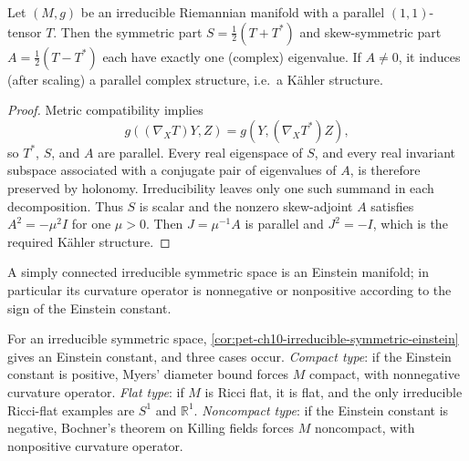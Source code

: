 \begin{theorem}
  \label{thm:pet-ch10-parallel-tensor-eigenvalue}

  Let $(M,g)$ be an irreducible Riemannian manifold with a parallel $(1,1)$-tensor
  $T$. Then the symmetric part $S=\tfrac12(T+T^*)$ and skew-symmetric part
  $A=\tfrac12(T-T^*)$ each have exactly one (complex) eigenvalue. If $A\ne0$, it
  induces (after scaling) a parallel complex structure, i.e.\ a Kähler structure.
\end{theorem}
\begin{proof}
  \sketch
  Metric compatibility implies
  \[
    g((\nabla_XT)Y,Z)=g(Y,(\nabla_XT^*)Z),
  \]
  so $T^*$, $S$, and $A$ are parallel. Every real eigenspace of $S$, and every
  real invariant subspace associated with a conjugate pair of eigenvalues of
  $A$, is therefore preserved by holonomy. Irreducibility leaves only one such
  summand in each decomposition. Thus $S$ is scalar and the nonzero
  skew-adjoint $A$ satisfies $A^2=-\mu^2I$ for one $\mu>0$. Then
  $J=\mu^{-1}A$ is parallel and $J^2=-I$, which is the required Kähler
  structure.
\end{proof}

\begin{corollary}
  \label{cor:pet-ch10-irreducible-symmetric-einstein}

  A simply connected irreducible symmetric space is an Einstein manifold; in
  particular its curvature operator is nonnegative or nonpositive according to
  the sign of the Einstein constant.
\end{corollary}

\begin{remark}
  \label{rem:pet-ch10-compact-flat-noncompact-type}

  For an irreducible symmetric space, \cref{cor:pet-ch10-irreducible-symmetric-einstein}
  gives an Einstein constant, and three cases occur. \emph{Compact type}: if the
  Einstein constant is positive, Myers' diameter bound forces $M$ compact, with
  nonnegative curvature operator. \emph{Flat type}: if $M$ is Ricci flat, it is
  flat, and the only irreducible Ricci-flat examples are $S^1$ and $\mathbb R^1$.
  \emph{Noncompact type}: if the Einstein constant is negative, Bochner's theorem
  on Killing fields forces $M$ noncompact, with nonpositive curvature operator.
\end{remark}

